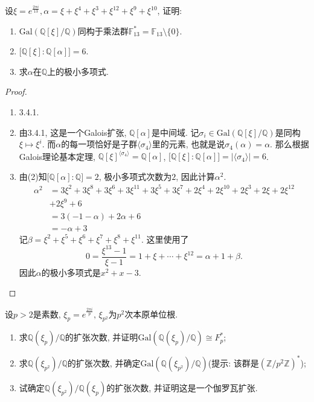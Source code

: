 \documentclass{../solutions-cn}
\begin{document}
\begin{exercise}[习题4.4.3]
    设$\xi = e^{\frac{2\pi i}{13}}, \alpha = \xi + \xi^4 + \xi^3 + \xi^{12} + \xi^9 + \xi^{10}$, 证明: 
    \begin{enumerate}[(1)]
        \item $\mathrm{Gal}\left(\mathbb{Q}[\xi]/\mathbb{Q}\right)$同构于乘法群$\mathbb{F}_{13}^* = \mathbb{F}_{13} \setminus \{0\}$.
        \item $\bigl[\mathbb{Q}[\xi]:\mathbb{Q}[\alpha]\bigr] = 6$.
        \item 求$\alpha$在$\mathbb{Q}$上的极小多项式.
    \end{enumerate}
\end{exercise}

\begin{proof}
    \begin{enumerate}[(1)]
        \item 3.4.1.
        \item 由3.4.1, 这是一个Galois扩张, $\mathbb{Q}[\alpha]$是中间域. 记$\sigma_i \in \mathrm{Gal}\left(\mathbb{Q}[\xi]/\mathbb{Q}\right)$是同构$\xi \mapsto \xi^i$. 而$\alpha$的每一项恰好是子群$\langle \sigma_4 \rangle$里的元素, 也就是说$\sigma_4(\alpha) = \alpha$. 那么根据Galois理论基本定理, $\mathbb{Q}[\xi]^{\langle \sigma_4 \rangle} = \mathbb{Q}[\alpha]$, $\bigl[\mathbb{Q}[\xi]:\mathbb{Q}[\alpha]\bigr] = |\langle \sigma_4 \rangle| = 6$.
        \item 由(2)知$\bigl[\mathbb{Q}[\alpha]:\mathbb{Q}\bigr] = 2$, 极小多项式次数为$2$, 因此计算$\alpha^2$.
        \[
        \begin{aligned}
            \alpha^2 &= 3\xi^2 + 3\xi^8 + 3\xi^6 + 3\xi^{11} + 3\xi^5 + 3\xi^7 + 2\xi^4 + 2\xi^{10} + 2\xi^3 + 2\xi + 2\xi^{12}\\
            &+ 2\xi^9 + 6\\
            &= 3(-1 - \alpha) + 2\alpha + 6\\
            &= -\alpha + 3
        \end{aligned}
        \]
        记$\beta = \xi^2 + \xi^5 + \xi^6 + \xi^7 + \xi^8 + \xi^{11}$. 这里使用了
        \[
            0 = \frac{\xi^{13} - 1}{\xi - 1}  = 1 + \xi + \cdots + \xi^{12} = \alpha + 1 + \beta.
        \]
        因此$\alpha$的极小多项式是$x^2 + x - 3$.
    \end{enumerate}
\end{proof}

\begin{exercise}[习题4.4.4]
    设$p > 2$是素数, $\xi_p = e^{\frac{2\pi i}p},\, \xi_{p^2}$为$p^2$次本原单位根.
    \begin{enumerate}[(1)]
        \item 求$\mathbb{Q}(\xi_p)/\mathbb{Q}$的扩张次数, 并证明$\mathrm{Gal}(\mathbb{Q}(\xi_p)/\mathbb{Q}) \cong F_p^*$;
        \item 求$\mathbb{Q}(\xi_{p^2})/\mathbb{Q}$的扩张次数, 并确定$\mathrm{Gal}(\mathbb{Q}(\xi_{p^2})/\mathbb{Q})$(提示: 该群是$(\mathbb{Z}/p^2\mathbb{Z})^*$);
        \item 试确定$\mathbb{Q}(\xi_{p^2})/\mathbb{Q}(\xi_p)$的扩张次数, 并证明这是一个伽罗瓦扩张.
    \end{enumerate}
\end{exercise}
\end{document}
